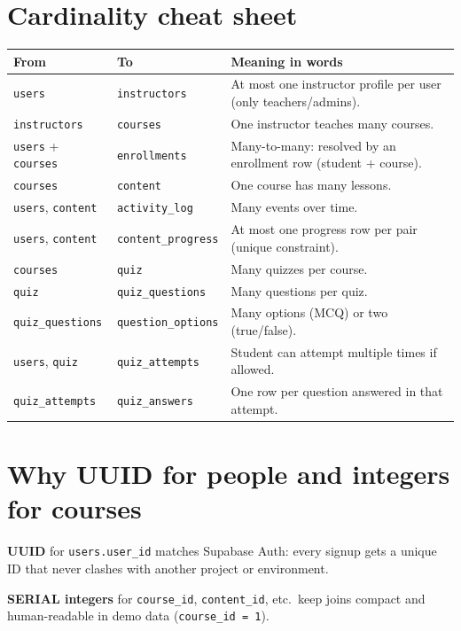 \section{Cardinality cheat sheet}
\begin{center}
\begin{tabular}{@{}lll@{}}
\toprule
\textbf{From} & \textbf{To} & \textbf{Meaning in words} \\
\midrule
\texttt{users} & \texttt{instructors} & At most one instructor profile per user (only teachers/admins). \\
\texttt{instructors} & \texttt{courses} & One instructor teaches many courses. \\
\texttt{users} + \texttt{courses} & \texttt{enrollments} & Many-to-many: resolved by an enrollment row (student + course). \\
\texttt{courses} & \texttt{content} & One course has many lessons. \\
\texttt{users}, \texttt{content} & \texttt{activity\_log} & Many events over time. \\
\texttt{users}, \texttt{content} & \texttt{content\_progress} & At most one progress row per pair (unique constraint). \\
\texttt{courses} & \texttt{quiz} & Many quizzes per course. \\
\texttt{quiz} & \texttt{quiz\_questions} & Many questions per quiz. \\
\texttt{quiz\_questions} & \texttt{question\_options} & Many options (MCQ) or two (true/false). \\
\texttt{users}, \texttt{quiz} & \texttt{quiz\_attempts} & Student can attempt multiple times if allowed. \\
\texttt{quiz\_attempts} & \texttt{quiz\_answers} & One row per question answered in that attempt. \\
\bottomrule
\end{tabular}
\end{center}

\section{Why UUID for people and integers for courses}
\textbf{UUID} for \texttt{users.user\_id} matches Supabase Auth: every signup gets a unique ID that never clashes with another project or environment.

\textbf{SERIAL integers} for \texttt{course\_id}, \texttt{content\_id}, etc.\ keep joins compact and human-readable in demo data (\texttt{course\_id = 1}).

